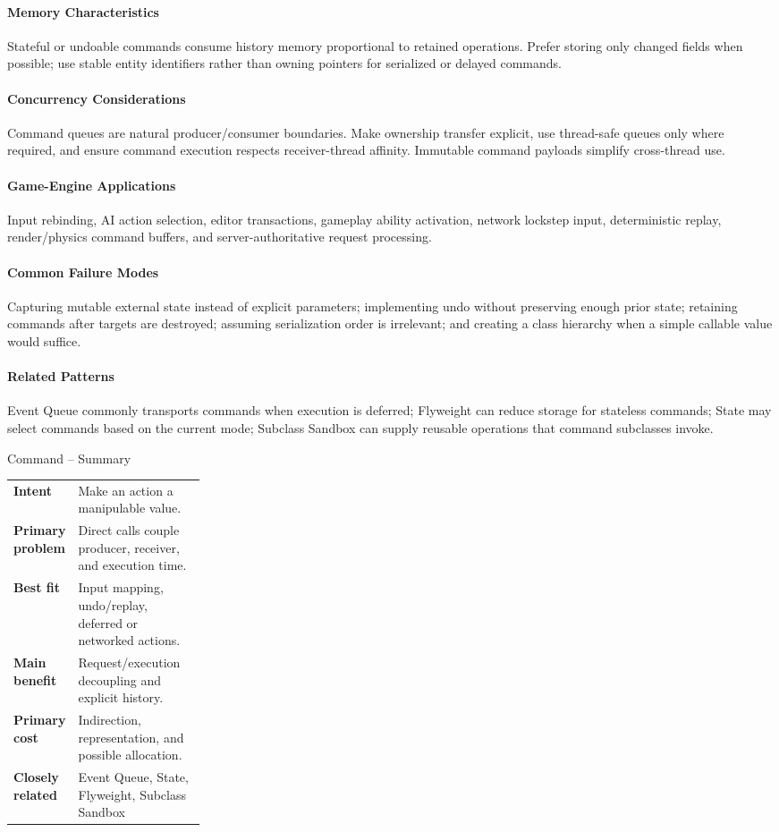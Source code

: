 \documentclass[11pt]{article}
\begin{document}
\paragraph{Memory Characteristics} Stateful or undoable commands consume history memory proportional to retained operations. Prefer storing only changed fields when possible; use stable entity identifiers rather than owning pointers for serialized or delayed commands.
\paragraph{Concurrency Considerations} Command queues are natural producer/consumer boundaries. Make ownership transfer explicit, use thread-safe queues only where required, and ensure command execution respects receiver-thread affinity. Immutable command payloads simplify cross-thread use.
\paragraph{Game-Engine Applications} Input rebinding, AI action selection, editor transactions, gameplay ability activation, network lockstep input, deterministic replay, render/physics command buffers, and server-authoritative request processing.
\paragraph{Common Failure Modes} Capturing mutable external state instead of explicit parameters; implementing undo without preserving enough prior state; retaining commands after targets are destroyed; assuming serialization order is irrelevant; and creating a class hierarchy when a simple callable value would suffice.
\paragraph{Related Patterns} Event Queue commonly transports commands when execution is deferred; Flyweight can reduce storage for stateless commands; State may select commands based on the current mode; Subclass Sandbox can supply reusable operations that command subclasses invoke.

\begin{patternsummary}{Command -- Summary}
\begin{tabularx}{\linewidth}{@{}>{\bfseries}p{0.25\linewidth}X@{}}
Intent & Make an action a manipulable value. \\
Primary problem & Direct calls couple producer, receiver, and execution time. \\
Best fit & Input mapping, undo/replay, deferred or networked actions. \\
Main benefit & Request/execution decoupling and explicit history. \\
Primary cost & Indirection, representation, and possible allocation. \\
Closely related & Event Queue, State, Flyweight, Subclass Sandbox \\
\end{tabularx}
\end{patternsummary}
\end{document}
